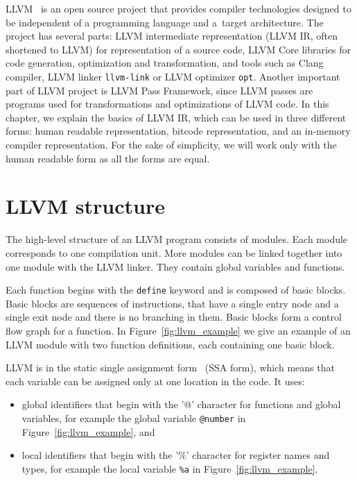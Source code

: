 LLVM~\cite{llvm} is an open source project that provides compiler technologies
designed to be independent of a programming language and a~target architecture.
The project has several parts: LLVM intermediate representation (LLVM IR, often
shortened to LLVM) for representation of a source code, LLVM Core libraries for
code generation, optimization and transformation, and tools such as Clang
compiler, LLVM linker \texttt{llvm-link} or LLVM optimizer \texttt{opt}.
Another important part of LLVM project is LLVM Pass Framework, since LLVM
passes are programs used for transformations and optimizations of LLVM code. In
this chapter, we explain the basics of LLVM IR, which can be used in three
different forms: human readable representation, bitcode representation, and an
in-memory compiler representation. For the sake of simplicity, we will work
only with the human readable form as all the forms are equal.


\section{LLVM structure}

The high-level structure of an LLVM program consists of modules. Each module
corresponds to one compilation unit. More modules can be linked together into
one module with the LLVM linker. They contain global variables and functions.

Each function begins with the \texttt{define} keyword and is composed of basic
blocks. Basic blocks are sequences of instructions, that have a single entry node
and a single exit node and there is no branching in them. Basic blocks form
a control flow graph for a function. In Figure~\ref{fig:llvm_example} we give
an example of an LLVM module with two function definitions, each containing one
basic block.

LLVM is in the static single assignment form~\cite{ssa} (SSA form), which means that each
variable can be assigned only at one location in the code. It uses:

\begin{itemize}
    \item global identifiers that begin with the '@' character for functions
    and global variables, for example the global variable \texttt{@number} in
    Figure~\ref{fig:llvm_example}, and
    \item local identifiers that begin with the '\%' character for register
    names and types, for example the local variable \texttt{\%a} in
    Figure~\ref{fig:llvm_example}.
\end{itemize}

